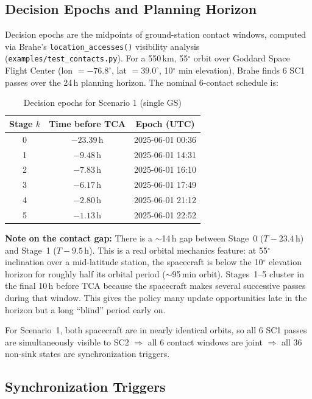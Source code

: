 \documentclass[11pt]{article}
\begin{document}
\subsection{Decision Epochs and Planning Horizon}

Decision epochs are the midpoints of ground-station contact windows, computed
via Brahe's \texttt{location\_accesses()} visibility analysis
(\texttt{examples/test\_contacts.py}). For a 550\,km, 55$^\circ$ orbit over Goddard
Space Flight Center (lon $= -76.8^\circ$, lat $= 39.0^\circ$, 10$^\circ$ min
elevation), Brahe finds 6 SC1 passes over the 24\,h planning horizon. The nominal
6-contact schedule is:

\begin{table}[h]
\centering
\caption{Decision epochs for Scenario 1 (single GS)}
\begin{tabular}{ccc}
\toprule
Stage $k$ & Time before TCA & Epoch (UTC) \\
\midrule
0 & $-23.39$\,h & 2025-06-01 00:36 \\
1 & $-9.48$\,h  & 2025-06-01 14:31 \\
2 & $-7.83$\,h  & 2025-06-01 16:10 \\
3 & $-6.17$\,h  & 2025-06-01 17:49 \\
4 & $-2.80$\,h  & 2025-06-01 21:12 \\
5 & $-1.13$\,h  & 2025-06-01 22:52 \\
\bottomrule
\end{tabular}
\end{table}

\noindent\textbf{Note on the contact gap:} There is a $\sim$14\,h gap between Stage~0
($T{-}23.4$\,h) and Stage~1 ($T{-}9.5$\,h). This is a real orbital mechanics feature: at
55$^\circ$ inclination over a mid-latitude station, the spacecraft is below the
10$^\circ$ elevation horizon for roughly half its orbital period ($\sim$95\,min orbit).
Stages~1--5 cluster in the final 10\,h before TCA because the spacecraft makes several
successive passes during that window. This gives the policy many update opportunities
late in the horizon but a long ``blind'' period early on.

For Scenario~1, both spacecraft are in nearly identical orbits, so all 6 SC1 passes
are simultaneously visible to SC2 $\Rightarrow$ all 6 contact windows are joint
$\Rightarrow$ all 36 non-sink states are synchronization triggers.

\subsection{Synchronization Triggers}
\end{document}
